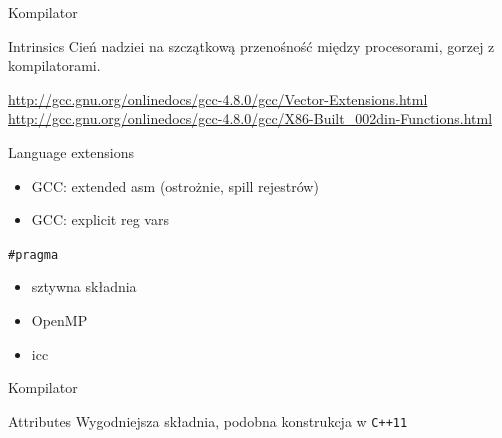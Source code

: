 \begin{frame}{Kompilator}
	\begin{block}{Intrinsics}
		Cień nadziei na szczątkową przenośność między procesorami, gorzej z kompilatorami.
		\begin{itemize}
			\item \verb*%__builtin_expect%
			\item \verb*%__builtin_cpu_supports("sse2")%
		\end{itemize}
		\url{http://gcc.gnu.org/onlinedocs/gcc-4.8.0/gcc/Vector-Extensions.html}
		\url{http://gcc.gnu.org/onlinedocs/gcc-4.8.0/gcc/X86-Built_002din-Functions.html}
	\end{block}
	\begin{block}{Language extensions}
		\begin{itemize}
			\item GCC: extended asm (ostrożnie, spill rejestrów)
			\item GCC: explicit reg vars
		\end{itemize}
	\end{block}
	\begin{block}{\texttt{\#pragma}}
		\begin{itemize}
			\item sztywna składnia
			\item OpenMP
			\item icc
		\end{itemize}
	\end{block}
\end{frame}
\begin{frame}{Kompilator}
	\begin{block}{Attributes}
		Wygodniejsza składnia, podobna konstrukcja w \texttt{C++11}
	\end{block}
\end{frame}
